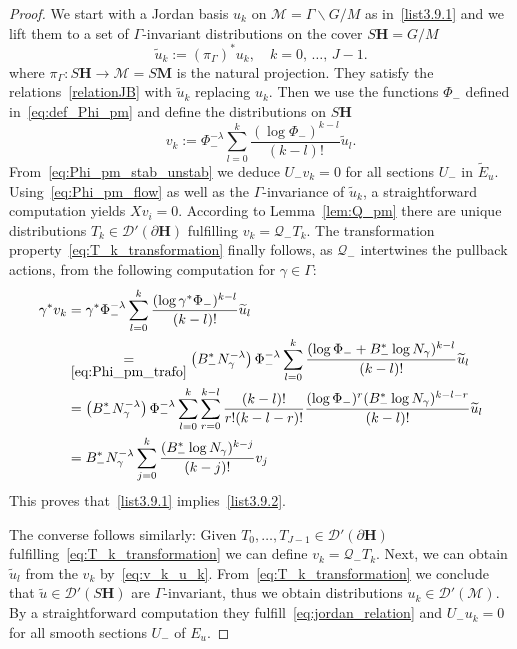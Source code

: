 \documentclass[AHL, Unicode, longabstracts, published]{cedram}
\newcommand{\mc}{\mathcal}
\newcommand{\bfh}{\mathbf{H}}
\newcommand{\bfm}{\mathbf{M}}
\newcommand{\pl}{\partial}
\newcommand{\til}{\widetilde}
\begin{document}
\begin{proof}
We start with a Jordan basis $u_k$ on $\mc{M}=\Gamma\backslash G/M$ as in~\eqref{list3.9.1} and we lift them to a set of $\Gamma$-invariant distributions on the cover $S{\bfh}=G/M$
\begin{equation}\label{eq:jordan_relation}
\til u_k := (\pi_{\Gamma})^*u_k,\quad k= 0,\,\ldots,\,J-1.
\end{equation}
where $\pi_{\Gamma} : S{\bfh}\to \mc{M}= S{\bfm}$ is the natural projection. They satisfy the relations~\eqref{relationJB} with $\til{u}_k$ replacing $u_k$. Then we use the functions $\Phi_-$ defined in~\eqref{eq:def_Phi_pm} and define the distributions on $S{\bfh}$
\begin{equation}\label{eq:v_k_u_k}
v_k := \Phi_-^{-\lambda} \sum_{l=0}^k \frac{(\log \Phi_-)^{k-l}}{(k-l)!}\til u_l.
\end{equation}
From~\eqref{eq:Phi_pm_stab_unstab} we deduce $U_- v_k =0$ for all sections $U_-$ in $\til{E}_u$. Using~\eqref{eq:Phi_pm_flow} as well as the $\Gamma$-invariance of $\til u_k$, a straightforward computation yields $X v_i =0$. According to Lemma~\ref{lem:Q_pm} there are unique distributions $T_k\in \mathcal D'(\pl{\bfh})$ fulfilling $v_k = \mathcal Q_- T_k$. The transformation property~\eqref{eq:T_k_transformation} finally follows, as $\mathcal Q_-$ intertwines the pullback actions, from the following computation for $\gamma\in \Gamma$:
\begin{align*}
\gamma^*v_k &= \gamma^*\Phi_-^{-\lambda}\sum_{l=0}^k \frac{(\log \gamma^*\Phi_-)^{k-l}}{(k-l)!}\til u_l\\
&\underset{\eqref{eq:Phi_pm_trafo}}{=}\left(B_-^* N_\gamma^{-\lambda}\right) \Phi_-^{-\lambda}
\sum_{l=0}^k \frac{(\log \Phi_-+B_-^*\log N_\gamma)^{k-l}}{(k-l)!}\til u_l\\
&= \left(B_-^* N_\gamma^{-\lambda}\right)\Phi_-^{-\lambda}
\sum_{l=0}^k \sum_{r=0}^{k-l} \frac{(k-l)!}{r!(k-l-r)!}\frac{(\log \Phi_-)^r(B_-^*\log N_\gamma)^{k-l-r}}{(k-l)!}\til u_l\\
&=B_-^*N_\gamma^{-\lambda}\sum_{j=0}^k \frac{(B_-^*\log N_\gamma)^{k-j}}{(k-j)!}v_j
\end{align*}
This proves that~\eqref{list3.9.1} implies~\eqref{list3.9.2}.

The converse follows similarly: Given $T_0,\ldots, T_{J-1} \in \mathcal D'(\pl{\bfh})$ fulfilling~\eqref{eq:T_k_transformation} we can define $v_k = \mathcal Q_- T_k$. Next, we can obtain $\til u_l$ from the $v_k$ by~\eqref{eq:v_k_u_k}. From~\eqref{eq:T_k_transformation} we conclude that $\til u\in \mathcal D'(S{\bfh})$ are $\Gamma$-invariant, thus we obtain distributions $u_k\in \mathcal D'(\mc{M})$. By a straightforward computation they fulfill~\eqref{eq:jordan_relation} and $U_- u_k=0$ for all smooth sections $U_-$ of $E_u$.
\end{proof}
\end{document}
